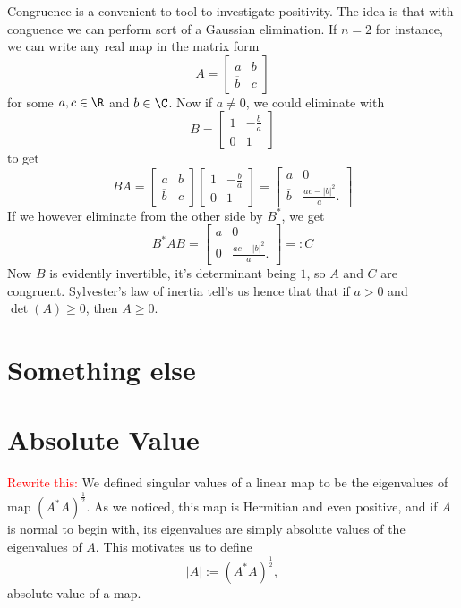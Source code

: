 Congruence is a convenient to tool to investigate positivity. The idea is that with conguence we can perform sort of a Gaussian elimination. If $n = 2$ for instance, we can write any real map in the matrix form
\[
	A =
	\begin{bmatrix}
		a & b \\
		\overline{b} & c
	\end{bmatrix}
\]
for some $a, c \in \R$ and $b \in \C$. Now if $a \neq 0$, we could eliminate with
\[
	B =
	\begin{bmatrix}
		1 & -\frac{b}{a} \\
		0 & 1
	\end{bmatrix}
\]
to get
\[
	B A =
	\begin{bmatrix}
		a & b \\
		\overline{b} & c
	\end{bmatrix}
	\begin{bmatrix}
		1 & -\frac{b}{a} \\
		0 & 1
	\end{bmatrix}
	=
	\begin{bmatrix}
		a & 0 \\
		\overline{b} & \frac{a c - |b|^2}{a}.
	\end{bmatrix}
\]
If we however eliminate from the other side by $B^{*}$, we get
\[
	B^{*} A B =
	\begin{bmatrix}
		a & 0 \\
		0 & \frac{a c - |b|^2}{a}.
	\end{bmatrix}
	=: C
\]
Now $B$ is evidently invertible, it's determinant being $1$, so $A$ and $C$ are congruent. Sylvester's law of inertia tell's us hence that that if $a > 0$ and $\det(A) \geq 0$, then $A \geq 0$.

\section{Something else}

\section{Absolute Value}

\textcolor{red}{Rewrite this:} We defined singular values of a linear map to be the eigenvalues of map $\left(A^{*}A\right)^{\frac{1}{2}}$. As we noticed, this map is Hermitian and even positive, and if $A$ is normal to begin with, its eigenvalues are simply absolute values of the eigenvalues of $A$. This motivates us to define
\[
	|A| := \left(A^{*}A\right)^{\frac{1}{2}},
\]
absolute value of a map.

